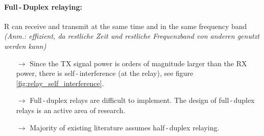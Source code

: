 \documentclass[a4paper, 10pt]{article}
\begin{document}
\paragraph{Full\,-\,Duplex relaying:} 
R can receive and transmit at the same time and in the same frequency band \textit{(Anm.: effizient, da restliche Zeit und restliche Frequenzband von anderen genutzt werden kann)}
\begin{itemize}
	\item[$\rightarrow$] Since the TX signal power is orders of magnitude larger than the RX power, there is self\,-\,interference (at the relay), see figure \ref{fig:relay_self_interference}.
	
	\item[$\rightarrow$] Full\,-\,duplex relays are difficult to implement. The design of full\,-\,duplex relays is an active area of research.
	\item[$\rightarrow$] Majority of existing literature assumes half\,-\,duplex relaying.
\end{itemize}
\end{document}
